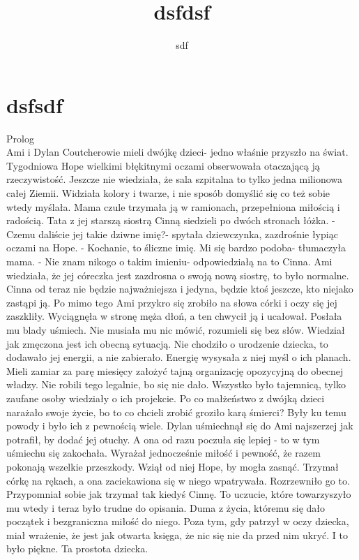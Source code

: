 \documentclass[12pt,a4paper]{book}
\author{sdf
}
\title{dsfdsf
}
\begin{document}
\maketitle
\chapter{dsfsdf
}
              Prolog
\\Ami i Dylan Coutcherowie mieli dwójkę dzieci- jedno właśnie przyszło na świat. Tygodniowa Hope wielkimi błękitnymi oczami obserwowała otaczającą ją rzeczywistość. Jeszcze nie wiedziała, że sala szpitalna to tylko jedna milionowa całej Ziemii. Widziała kolory i twarze, i nie sposób domyślić się co też sobie wtedy myślała. Mama czule trzymała ją w ramionach, przepełniona miłością i radością. Tata z jej  starszą siostrą Cinną siedzieli po dwóch stronach łóżka. 
- Czemu daliście jej takie dziwne imię?- spytała dziewczynka, zazdrośnie łypiąc oczami na Hope.
- Kochanie, to śliczne imię. Mi się bardzo podoba- tłumaczyła mama.
- Nie znam nikogo o takim imieniu- odpowiedziałą na to Cinna. 
Ami wiedziała, że jej córeczka jest zazdrosna o swoją nową siostrę, to było normalne. Cinna od teraz nie będzie najważniejsza i jedyna, będzie ktoś jeszcze, kto niejako zastąpi ją. Po mimo tego Ami przykro się zrobiło na słowa córki i oczy się jej zaszkliły. Wyciągnęła w stronę męża dłoń, a ten chwycił ją i ucałował. Posłała mu blady uśmiech. Nie musiała mu nic mówić, rozumieli się bez słów. Wiedział jak zmęczona jest ich obecną sytuacją. Nie chodziło o urodzenie dziecka, to dodawało jej energii, a nie zabierało. Energię wysysała z niej myśl o ich planach. Mieli zamiar za parę miesięcy założyć tajną organizację opozycyjną do obecnej władzy. Nie robili tego legalnie, bo się nie dało. Wszystko było tajemnicą, tylko zaufane osoby wiedziały o ich projekcie. Po co małżeństwo z dwójką dzieci narażało swoje życie, bo to  co chcieli zrobić groziło karą śmierci? Były ku temu powody i było ich z pewnością wiele. 
Dylan  uśmiechnął się do Ami najszerzej jak potrafił, by dodać jej otuchy. A ona od razu poczuła się lepiej - to w tym uśmiechu się zakochała. Wyrażał jednocześnie miłość i pewność, że razem pokonają wszelkie przeszkody. 
Wziął od  niej Hope, by mogła zasnąć. Trzymał córkę na rękach, a ona zaciekawiona się w niego wpatrywała. Rozrzewniło go to. Przypomniał sobie jak trzymał tak kiedyś Cinnę. To uczucie, które towarzyszyło mu wtedy i teraz było trudne do opisania. Duma z życia, któremu się dało początek i bezgraniczna miłość do niego. Poza tym, gdy patrzył w oczy dziecka, miał wrażenie, że jest jak otwarta księga, że nic się nie da przed nim ukryć. I to było piękne. Ta prostota dziecka.
\end{document}
